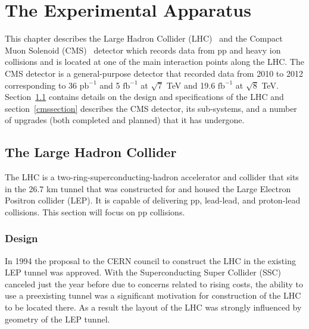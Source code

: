 
\chapter{The Experimental Apparatus} %

\label{apparatus} %



This chapter describes the Large Hadron Collider (LHC)~\cite{LHCmachine} and the Compact Muon Solenoid (CMS)~\cite{CMSdetector} detector which records data from pp and heavy ion collisions and is located at one of the main interaction points along the LHC.  The CMS detector is a general-purpose detector that recorded data from 2010 to 2012 corresponding to 36 $\text{pb}^{-1}$ and 5 $\text{fb}^{-1}$ at $\sqrt{7}$ TeV and 19.6 $\text{fb}^{-1}$ at $\sqrt{8}$ TeV.  Section~\ref{lhcsection} contains details on the design and specifications of the LHC and section~\ref{cmssection} describes the CMS detector, its sub-systems, and a number of upgrades (both completed and planned) that it has undergone.

\section{The Large Hadron Collider}
\label{lhcsection}

The LHC is a two-ring-superconducting-hadron accelerator and collider that sits in the 26.7 km tunnel that was constructed for and housed the Large Electron Positron collider (LEP).  It is capable of delivering pp, lead-lead, and proton-lead collisions.  This section will focus on pp collisions.

\subsection{Design}

In 1994 the proposal to the CERN council to construct the LHC in the existing LEP tunnel was approved.  With the Superconducting Super Collider (SSC) canceled just the year before due to concerns related to rising costs, the ability to use a preexisting tunnel was a significant motivation for construction of the LHC to be located there.  As a result the layout of the LHC was strongly influenced by geometry of the LEP tunnel.

